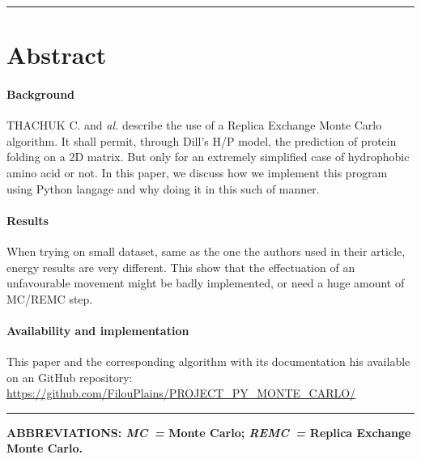 \documentclass[12pt, oneside, a4paper]{report}
\begin{document}
\begin{center}
    \begin{minipage}{16cm}
        \hrule height 0.5pt width 16cm
        \vspace{1ex}
        \section*{Abstract}

        \paragraph*{Background}
        THACHUK C. and \textit{al.} describe the use of a Replica Exchange Monte Carlo algorithm. It shall permit, through Dill's H/P model, the prediction of protein folding on a 2D matrix. But only for an extremely simplified case of hydrophobic amino acid or not. In this paper, we discuss how we implement this program using Python langage and why doing it in this such of manner.

        \vspace{1ex}

        \paragraph*{Results}
        When trying on small dataset, same as the one the authors used in their article, energy results are very different. This show that the effectuation of an unfavourable movement might be badly implemented, or need a huge amount of MC/REMC step.

        \vspace{1ex}

        \paragraph*{Availability and implementation}
        This paper and the corresponding algorithm with its documentation his available on an GitHub repository: \url{https://github.com/FilouPlains/PROJECT_PY_MONTE_CARLO/}

        \vspace{1ex}
        \hrule height 0.5pt width 16cm
        
        \vspace{1ex}
        
        \begin{footnotesize}
            \bfseries ABBREVIATIONS: \textit{MC~=} Monte Carlo; \textit{REMC~=} Replica Exchange Monte Carlo.
        \end{footnotesize}
    \end{minipage}
\end{center}
\end{document}
